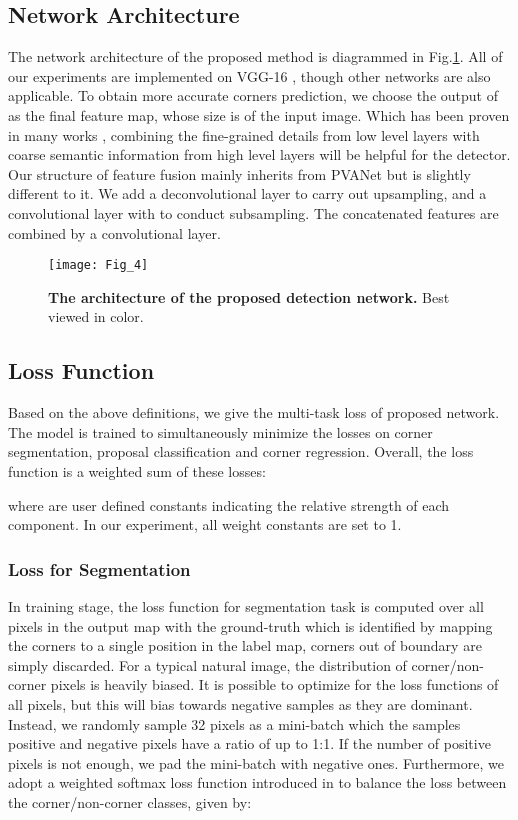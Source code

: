 \documentclass[3p, times]{elsarticle}
\begin{document}
\subsection{Network Architecture}
The network architecture of the proposed method is diagrammed in Fig.\ref{Fig_4}. All of our experiments are implemented on VGG-16 \cite{VGG2015ICLR}, though other networks are also applicable. To obtain more accurate corners prediction, we choose the output of  as the final feature map, whose size is  of the input image. Which has been proven in many works \cite{HYPERNET2016CVPR, PVANET2016ARXIV}, combining the fine-grained details from low level layers with coarse semantic information from high level layers will be helpful for the detector. Our structure of feature fusion mainly inherits from PVANet \cite{PVANET2016ARXIV} but is slightly different to it. We add a deconvolutional layer to carry out upsampling, and a  convolutional layer with  to conduct subsampling. The concatenated features are combined by a  convolutional layer.

\begin{figure}[!htb]
\centering
\texttt{[image: Fig\_4]}
\caption{\textbf{The architecture of the proposed detection network.} Best viewed in color.}
\label{Fig_4}
\end{figure}



\subsection{Loss Function}
Based on the above definitions, we give the multi-task loss  of proposed network. The model is trained to simultaneously minimize the losses on corner segmentation, proposal classification and corner regression. Overall, the loss function is a weighted sum of these losses:



\noindent where  are user defined constants indicating the relative strength of each component. In our experiment, all weight constants  are set to 1.


\subsubsection{Loss for Segmentation}
In training stage, the loss function for segmentation task is computed over all pixels in the output map with the ground-truth which is identified by mapping the corners to a single position in the label map, corners out of boundary are simply discarded.  For a typical natural image, the distribution of corner/non-corner pixels is heavily biased. It is possible to optimize for the loss functions of all pixels, but this will bias towards negative samples as they are dominant. Instead, we randomly sample 32 pixels as a mini-batch which the samples positive and negative pixels have a ratio of up to 1:1. If the number of positive pixels is not enough, we pad the mini-batch with negative ones. Furthermore, we adopt a weighted softmax loss function introduced in \cite{FSDS2016CVPR} to balance the loss between the corner/non-corner classes, given by:
\end{document}
